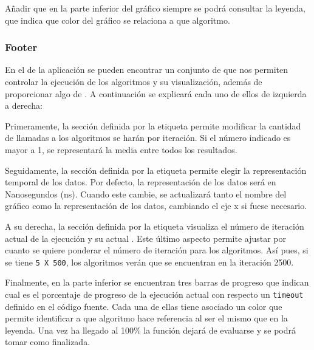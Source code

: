 Añadir que en la parte inferior del gráfico siempre se podrá consultar la leyenda, que indica que color del gráfico se relaciona a que algoritmo.

\subsubsection{Footer}
En el  de la aplicación se pueden encontrar un conjunto de  que nos permiten controlar la ejecución de los algoritmos y su visualización, además de proporcionar algo de
. A continuación se explicará cada uno de ellos de izquierda a derecha:\bigskip

Primeramente, la sección definida por la etiqueta  permite modificar la cantidad de llamadas a los algoritmos se harán por iteración. Si el número indicado es mayor a 1, se representará la media entre todos los resultados. \bigskip

Seguidamente, la sección definida por la etiqueta  permite elegir la representación temporal de los datos. Por defecto, la representación de los datos será en Nanosegundos (ns). Cuando este cambie, se actualizará tanto el nombre del gráfico como la representación de los datos, cambiando el eje x si fuese necesario. \bigskip

A su derecha, la sección definida por la etiqueta  visualiza el número de iteración actual de la ejecución y su actual . Este último aspecto permite ajustar por cuanto se quiere ponderar el número de iteración para los algoritmos. Así pues, si se tiene \texttt{5 X 500}, los algoritmos verán que se encuentran en la iteración 2500. \bigskip

Finalmente, en la parte inferior se encuentran tres barras de progreso que indican cual es el porcentaje de progreso de la ejecución actual con respecto un \texttt{timeout} definido en el código fuente. Cada una de ellas tiene asociado un color que permite identificar a que algoritmo hace referencia al ser el mismo que en la leyenda. Una vez ha llegado al 100\% la función dejará de evaluarse y se podrá tomar como finalizada.\bigskip

